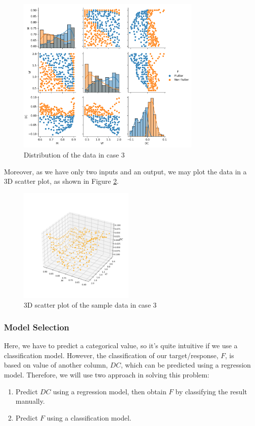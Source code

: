 \documentclass[conf]{new-aiaa}
\begin{document}
\begin{figure}
    \centering
    \includegraphics[width=0.8\textwidth]{graph/case3_data_dist_hue.png}
    \caption{Distribution of the data in case 3}
    \label{fig:case3_data_dist}
\end{figure}
Moreover, as we have only two inputs and an output, we may plot the data in a 3D scatter plot, as shown in Figure \ref{fig:case3_3d_scatter}.
\begin{figure}
    \centering
    \includegraphics[width=0.5\textwidth]{graph/case3_3d_scatter.png}
    \caption{3D scatter plot of the sample data in case 3}
    \label{fig:case3_3d_scatter}
\end{figure}

\subsubsection{Model Selection}
Here, we have to predict a categorical value, so it's quite intuitive if we use a classification model. However, the classification of our target/response, $F$, is based on value of another column, $DC$, which can be predicted using a regression model. Therefore, we will use two approach in solving this problem:
\begin{enumerate}
    \item Predict $DC$ using a regression model, then obtain $F$ by classifying the result manually.
    \item Predict $F$ using a classification model.
\end{enumerate}
\end{document}
